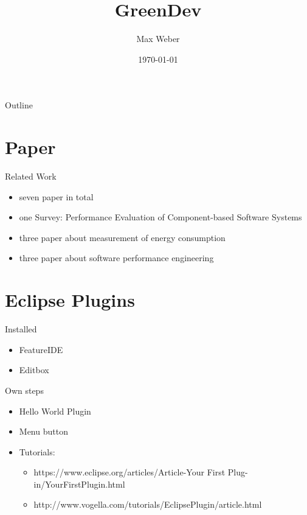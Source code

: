 \documentclass[11pt,aspectratio=169]{beamer}
\title[Green Development]{GreenDev}
\author[M. Weber]{Max Weber}
\institute[Bauhaus-Universität Weimar]{}
\date[\today]{\today}
\begin{document}

\maketitle

\begin{frame}{Outline}
\tableofcontents
\end{frame}

\section{Paper}

\begin{frame}{Related Work}
  \begin{itemize}
    \item seven paper in total
    \item one Survey: Performance Evaluation of Component-based Software Systems
    \item three paper about measurement of energy consumption
    \item three paper about software performance engineering
  \end{itemize}
\end{frame}

\section{Eclipse Plugins}

\begin{frame}{Installed}
  \begin{itemize}
    \item FeatureIDE
    \item Editbox
  \end{itemize}
\end{frame}


\begin{frame}{Own steps}
  \begin{itemize}
    \item Hello World Plugin
    \item Menu button
    \item Tutorials: 
    \begin{itemize}
      \item https://www.eclipse.org/articles/Article-Your First Plug-in/YourFirstPlugin.html
      \item http://www.vogella.com/tutorials/EclipsePlugin/article.html
    \end{itemize}
  \end{itemize}
\end{frame}
\end{document}
